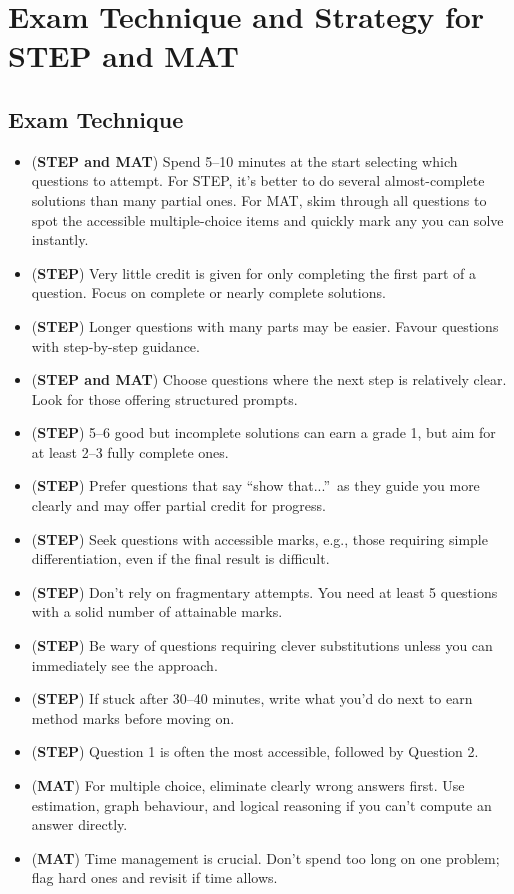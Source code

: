 \documentclass[11pt]{article}
\begin{document}
\appendix
\section{Exam Technique and Strategy for STEP and MAT}\label{sec:examtips}

\subsection{Exam Technique}
\begin{itemize}
\item (\textbf{STEP and MAT}) Spend 5--10 minutes at the start selecting which questions to attempt. For STEP, it's better to do several almost-complete solutions than many partial ones. For MAT, skim through all questions to spot the accessible multiple-choice items and quickly mark any you can solve instantly.
\item (\textbf{STEP}) Very little credit is given for only completing the first part of a question. Focus on complete or nearly complete solutions.
\item (\textbf{STEP}) Longer questions with many parts may be easier. Favour questions with step-by-step guidance.
\item (\textbf{STEP and MAT}) Choose questions where the next step is relatively clear. Look for those offering structured prompts.
\item (\textbf{STEP}) 5--6 good but incomplete solutions can earn a grade 1, but aim for at least 2--3 fully complete ones.
\item (\textbf{STEP}) Prefer questions that say \textquotedblleft show that...\textquotedblright\ as they guide you more clearly and may offer partial credit for progress.
\item (\textbf{STEP}) Seek questions with accessible marks, e.g., those requiring simple differentiation, even if the final result is difficult.
\item (\textbf{STEP}) Don't rely on fragmentary attempts. You need at least 5 questions with a solid number of attainable marks.
\item (\textbf{STEP}) Be wary of questions requiring clever substitutions unless you can immediately see the approach.
\item (\textbf{STEP}) If stuck after 30--40 minutes, write what you'd do next to earn method marks before moving on.
\item (\textbf{STEP}) Question 1 is often the most accessible, followed by Question 2.
\item (\textbf{MAT}) For multiple choice, eliminate clearly wrong answers first. Use estimation, graph behaviour, and logical reasoning if you can’t compute an answer directly.
\item (\textbf{MAT}) Time management is crucial. Don’t spend too long on one problem; flag hard ones and revisit if time allows.
\end{itemize}
\end{document}
